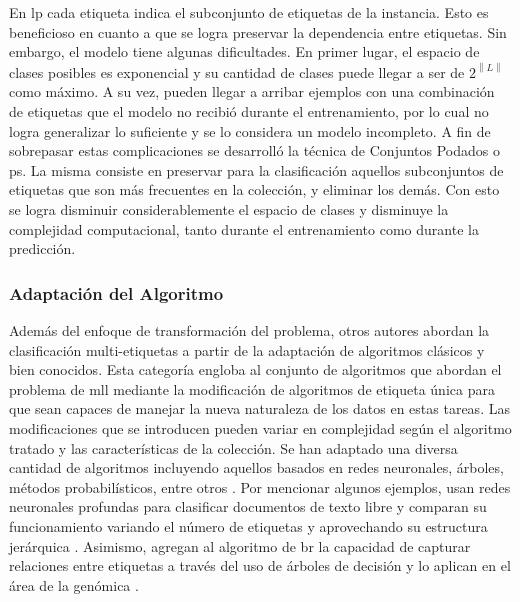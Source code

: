 En \acrshort{lp} cada etiqueta indica el subconjunto de etiquetas de
la instancia. Esto es beneficioso en cuanto a que se logra preservar la
dependencia entre etiquetas. Sin embargo, el modelo tiene algunas dificultades.
En primer lugar, el espacio de clases posibles es exponencial y su cantidad de
clases puede llegar a ser de $2^{\left\|L\right\|}$ como máximo. A su vez, pueden
llegar a arribar ejemplos con una combinación de etiquetas que el modelo no
recibió durante el entrenamiento, por lo cual no logra generalizar lo suficiente
y se lo considera un modelo incompleto. A fin de sobrepasar estas complicaciones
se desarrolló la técnica de Conjuntos Podados o \acrfull{ps}. La misma consiste
en preservar para la clasificación aquellos subconjuntos de etiquetas que son
más frecuentes en la colección, y eliminar los demás. Con esto se logra
disminuir considerablemente el espacio de clases y disminuye la complejidad
computacional, tanto durante el entrenamiento como durante la predicción.

\subsubsection{Adaptación del Algoritmo}

Además del enfoque de transformación del problema, otros autores abordan la
clasificación multi-etiquetas a partir de la adaptación de algoritmos clásicos y
bien conocidos. Esta categoría engloba al conjunto de algoritmos que abordan el
problema de \acrshort{mll} mediante la modificación de algoritmos de etiqueta
única para que sean capaces de manejar la nueva naturaleza de los datos en estas
tareas. Las modificaciones que se introducen pueden variar en complejidad según
el algoritmo tratado y las características de la colección.  Se han adaptado una
diversa cantidad de algoritmos incluyendo aquellos basados en redes neuronales,
árboles, métodos probabilísticos, entre otros \cite{herrera_multilabel_2016}.
Por mencionar algunos ejemplos, \citeauthor{gargiulo_deep_2018} usan redes
neuronales profundas para clasificar documentos de texto libre y comparan su
funcionamiento variando el número de etiquetas y aprovechando su estructura
jerárquica \cite{gargiulo_deep_2018}. Asimismo,
\citeauthor{tanaka_multi-label_2015} agregan al algoritmo de \acrshort{br} la
capacidad de capturar relaciones entre etiquetas a través del uso de árboles de
decisión y lo aplican en el área de la genómica \cite{tanaka_multi-label_2015}.

